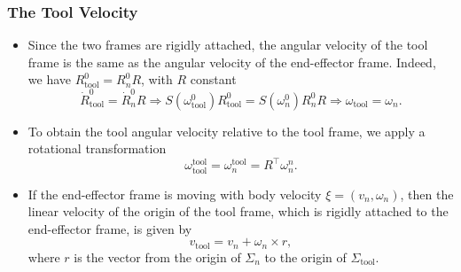 \begin{frame}
    \frametitle{The Tool Velocity}

    \begin{itemize}
        \item Since the two frames are rigidly attached, the angular velocity of
        the tool frame is the same as the angular velocity of the end-effector
        frame. Indeed, we have $R_{\textrm{tool}}^0 = R_n^0R$, with $R$ constant
        \[
            \dot{R}_{\textrm{tool}}^0 = \dot{R}_n^0R \Longrightarrow 
            S\left( \omega_{\textrm{tool}}^0 \right)R_{\textrm{tool}}^0 = S\left( \omega_n^0 \right)R_n^0R
            \Longrightarrow \omega_{\textrm{tool}} = \omega_n.
        \]
        \item To obtain the tool angular velocity relative to the tool frame, we
        apply a rotational transformation \[
        \omega_{\textrm{tool}}^{\textrm{tool}} = \omega_n^{\textrm{tool}} =
        R^\top \omega_n^n. \]
        \item If the end-effector frame is moving with body velocity $\xi =
        (v_n, \omega_n)$, then the linear velocity of the origin of the tool
        frame, which is rigidly attached to the end-effector frame, is given by
        \[ v_{\textrm{tool}} = v_n + \omega_n \times r, \] where $r$ is the
        vector from the origin of $\Sigma_n$ to the origin of
        $\Sigma_{\textrm{tool}}$.
    \end{itemize}
\end{frame}


